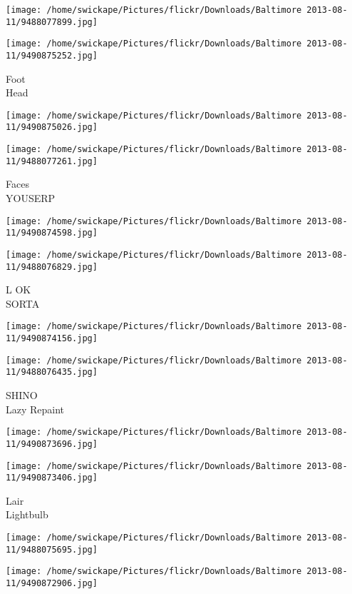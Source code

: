 \documentclass[10pt,letterpaper]{article}
\begin{document}
\texttt{[image: /home/swickape/Pictures/flickr/Downloads/Baltimore 2013-08-11/9488077899.jpg]}

\vspace{0.25in}
\texttt{[image: /home/swickape/Pictures/flickr/Downloads/Baltimore 2013-08-11/9490875252.jpg]}

Foot\\
Head
\pagebreak

\texttt{[image: /home/swickape/Pictures/flickr/Downloads/Baltimore 2013-08-11/9490875026.jpg]}

\vspace{0.25in}
\texttt{[image: /home/swickape/Pictures/flickr/Downloads/Baltimore 2013-08-11/9488077261.jpg]}

Faces\\
YOUSERP
\pagebreak

\texttt{[image: /home/swickape/Pictures/flickr/Downloads/Baltimore 2013-08-11/9490874598.jpg]}

\vspace{0.25in}
\texttt{[image: /home/swickape/Pictures/flickr/Downloads/Baltimore 2013-08-11/9488076829.jpg]}

L OK\\
SORTA
\pagebreak

\texttt{[image: /home/swickape/Pictures/flickr/Downloads/Baltimore 2013-08-11/9490874156.jpg]}

\vspace{0.25in}
\texttt{[image: /home/swickape/Pictures/flickr/Downloads/Baltimore 2013-08-11/9488076435.jpg]}

SHINO\\
Lazy Repaint
\pagebreak

\texttt{[image: /home/swickape/Pictures/flickr/Downloads/Baltimore 2013-08-11/9490873696.jpg]}

\vspace{0.25in}
\texttt{[image: /home/swickape/Pictures/flickr/Downloads/Baltimore 2013-08-11/9490873406.jpg]}

Lair\\
Lightbulb
\pagebreak

\texttt{[image: /home/swickape/Pictures/flickr/Downloads/Baltimore 2013-08-11/9488075695.jpg]}

\vspace{0.25in}
\texttt{[image: /home/swickape/Pictures/flickr/Downloads/Baltimore 2013-08-11/9490872906.jpg]}
\end{document}
